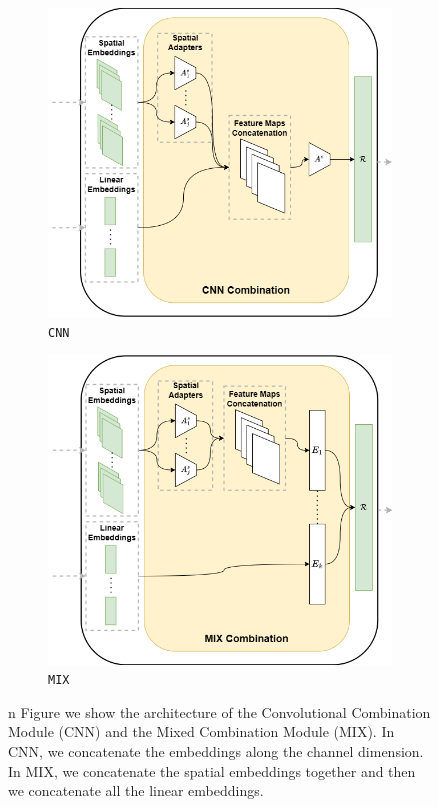 \begin{figure}[ht]
    \centering
    \begin{subfigure}[b]{0.49\textwidth}
        \centering
        \includegraphics[width=\textwidth]{images/cnn}
        \caption{\texttt{CNN}}
        \label{fig:cnn}
    \end{subfigure}
    \hfill
    \begin{subfigure}[b]{0.49\textwidth}
        \centering
        \includegraphics[width=\textwidth]{images/mix}
        \caption{\texttt{MIX}}
        \label{fig:mix}
    \end{subfigure}

    \caption{n Figure we show the architecture of the Convolutional Combination Module (CNN) and the Mixed Combination Module (MIX). In CNN, we concatenate the embeddings along the channel dimension. In MIX, we concatenate the spatial embeddings together and then we concatenate all the linear embeddings.}
    \label{fig:conv_combination}
\end{figure}

